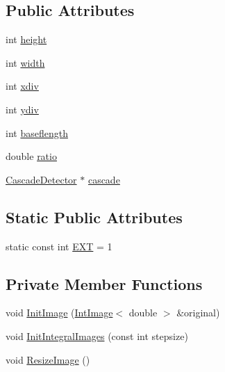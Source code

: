 \subsection*{Public Attributes}
\begin{DoxyCompactItemize}
\item 
int \mbox{\hyperlink{class_detection_scanner_a0526f032d5e7efd9fced2592ad5c8d03}{height}}
\item 
int \mbox{\hyperlink{class_detection_scanner_a37d12c13060640ad0321f089cd565476}{width}}
\item 
int \mbox{\hyperlink{class_detection_scanner_ab7083b6ed15a71fa96d623a8f6500613}{xdiv}}
\item 
int \mbox{\hyperlink{class_detection_scanner_a78f38bf8d0990ad9ea8cea03ffe4a189}{ydiv}}
\item 
int \mbox{\hyperlink{class_detection_scanner_aee5791fae7267a2f4a56e429d8842e6e}{baseflength}}
\item 
double \mbox{\hyperlink{class_detection_scanner_a2ac93d1b6aca1959d57133c08b0eaa1c}{ratio}}
\item 
\mbox{\hyperlink{class_cascade_detector}{Cascade\+Detector}} $\ast$ \mbox{\hyperlink{class_detection_scanner_a5fd4ac1b6a6c56a95543eca549c26634}{cascade}}
\end{DoxyCompactItemize}
\subsection*{Static Public Attributes}
\begin{DoxyCompactItemize}
\item 
static const int \mbox{\hyperlink{class_detection_scanner_a39359ef3b899cbb728cc31f17b7cb583}{E\+XT}} = 1
\end{DoxyCompactItemize}
\subsection*{Private Member Functions}
\begin{DoxyCompactItemize}
\item 
void \mbox{\hyperlink{class_detection_scanner_af275e1362a1bc351f9a92323e0860d27}{Init\+Image}} (\mbox{\hyperlink{class_int_image}{Int\+Image}}$<$ double $>$ \&original)
\item 
void \mbox{\hyperlink{class_detection_scanner_a3fda62eb396e2bff3e2cd2b8ec5079a1}{Init\+Integral\+Images}} (const int stepsize)
\item 
void \mbox{\hyperlink{class_detection_scanner_a01790349ec7aef4ff03335d5e76f183a}{Resize\+Image}} ()
\end{DoxyCompactItemize}
